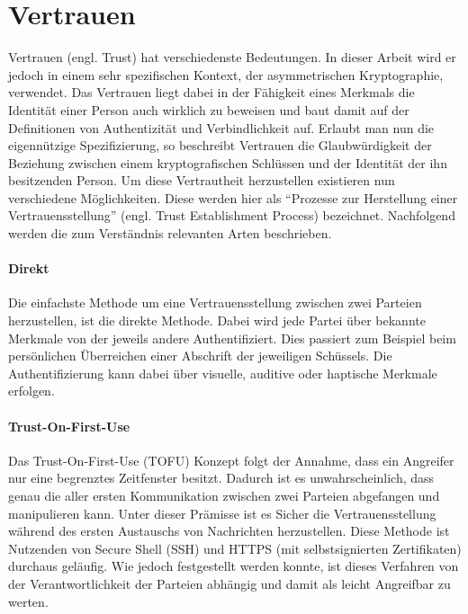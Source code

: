 \section{Vertrauen}
\label{sec:trust}
Vertrauen (engl. Trust) hat verschiedenste Bedeutungen. In dieser Arbeit wird er jedoch in einem sehr spezifischen Kontext, der asymmetrischen Kryptographie, verwendet. Das Vertrauen liegt dabei in der Fähigkeit eines Merkmals die Identität einer Person auch wirklich zu beweisen und baut damit auf der Definitionen von Authentizität und Verbindlichkeit auf\cite{Perrin2010}. Erlaubt man nun die eigennützige Spezifizierung, so beschreibt Vertrauen die Glaubwürdigkeit der Beziehung zwischen einem kryptografischen Schlüssen und der Identität der ihn besitzenden Person. Um diese Vertrautheit herzustellen existieren nun verschiedene Möglichkeiten. Diese werden hier als ``Prozesse zur Herstellung einer Vertrauensstellung'' (engl. Trust Establishment Process) bezeichnet. Nachfolgend werden die zum Verständnis relevanten Arten beschrieben.

\paragraph{Direkt}
Die einfachste Methode um eine Vertrauensstellung zwischen zwei Parteien herzustellen, ist die direkte Methode. Dabei wird jede Partei über bekannte Merkmale von der jeweils andere Authentifiziert. Dies passiert zum Beispiel beim persönlichen Überreichen einer Abschrift der jeweiligen Schüssels. Die Authentifizierung kann dabei über visuelle, auditive oder haptische Merkmale erfolgen.

\paragraph{Trust-On-First-Use}
Das Trust-On-First-Use (TOFU) Konzept folgt der Annahme, dass ein Angreifer nur eine begrenztes Zeitfenster besitzt. Dadurch ist es unwahrscheinlich, dass genau die aller ersten Kommunikation zwischen zwei Parteien abgefangen und manipulieren kann. Unter dieser Prämisse ist es Sicher die Vertrauensstellung während des ersten Austauschs von Nachrichten herzustellen. Diese Methode ist Nutzenden von Secure Shell (SSH) und HTTPS (mit selbstsignierten Zertifikaten) durchaus geläufig. Wie jedoch festgestellt werden konnte, ist dieses Verfahren von der Verantwortlichkeit der Parteien abhängig und damit als leicht Angreifbar zu werten\cite{Wendlandt2008}.

